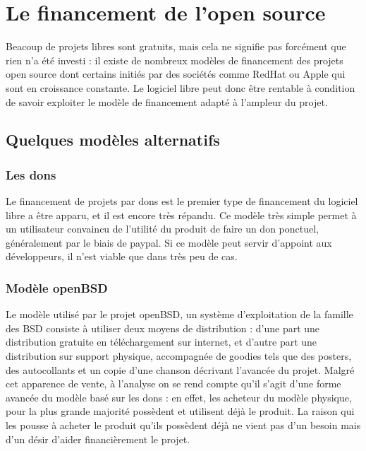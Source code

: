\chapter{Le financement de l'open source}

Beacoup de projets libres sont gratuits, mais cela ne signifie pas forcément
que rien n'a été investi : il existe de nombreux modèles de financement des
projets open source dont certains initiés par des sociétés comme RedHat ou Apple
qui sont en croissance constante. Le logiciel libre peut donc être rentable à
condition de savoir exploiter le modèle de financement adapté à l'ampleur du
projet.

\section{Quelques modèles alternatifs}

    \subsection{Les dons}

Le financement de projets par dons est le premier type de financement du 
logiciel libre a être apparu, et il est encore très répandu.
Ce modèle très simple permet à un utilisateur convaincu de l'utilité du 
produit de faire un don ponctuel, généralement par le biais de paypal.
Si ce modèle peut servir d'appoint aux développeurs, il n'est viable que dans 
très peu de cas.

    \subsection{Modèle openBSD}

Le modèle utilisé par le projet openBSD, un système d'exploitation de la 
famille des BSD consiste à utiliser deux moyens de distribution : d'une part 
une distribution gratuite en téléchargement sur internet, et d'autre part une 
distribution sur support physique, accompagnée de goodies tels que des posters,
des autocollants et un copie d'une chanson décrivant l'avancée du projet.
Malgré cet apparence de vente, à l'analyse on se rend compte qu'il s'agit
d'une forme avancée du modèle basé sur les dons : en effet, les acheteur du
modèle physique, pour la plus grande majorité possèdent et utilisent déjà le 
produit. La raison qui les pousse à acheter le produit qu'ils possèdent déjà 
ne vient pas d'un besoin mais d'un désir d'aider financièrement le projet.

